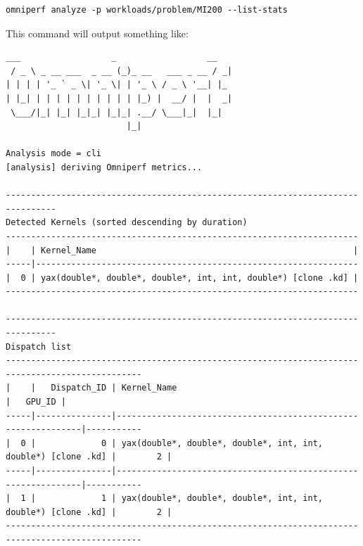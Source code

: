 \documentclass[
]{article}
\begin{document}
\begin{Verbatim}
omniperf analyze -p workloads/problem/MI200 --list-stats
\end{Verbatim}

This command will output something like:

\begin{Verbatim}[fontsize=\footnotesize] 
                                                                                                                                                                                                                  ___                  _                  __
 / _ \ _ __ ___  _ __ (_)_ __   ___ _ __ / _|
| | | | '_ ` _ \| '_ \| | '_ \ / _ \ '__| |_
| |_| | | | | | | | | | | |_) |  __/ |  |  _|
 \___/|_| |_| |_|_| |_|_| .__/ \___|_|  |_|
                        |_|

Analysis mode = cli
[analysis] deriving Omniperf metrics...
                                                                                                                                                                                                                --------------------------------------------------------------------------------
Detected Kernels (sorted descending by duration)
----------------------------------------------------------------------
|    | Kernel_Name                                                   |
-----|----------------------------------------------------------------
|  0 | yax(double*, double*, double*, int, int, double*) [clone .kd] |
----------------------------------------------------------------------
                                                                                                                                                                                                                --------------------------------------------------------------------------------
Dispatch list
-------------------------------------------------------------------------------------------------
|    |   Dispatch_ID | Kernel_Name                                                   |   GPU_ID |
-----|---------------|---------------------------------------------------------------|-----------
|  0 |             0 | yax(double*, double*, double*, int, int, double*) [clone .kd] |        2 |
-----|---------------|---------------------------------------------------------------|-----------
|  1 |             1 | yax(double*, double*, double*, int, int, double*) [clone .kd] |        2 |
-------------------------------------------------------------------------------------------------
\end{Verbatim}
\end{document}

